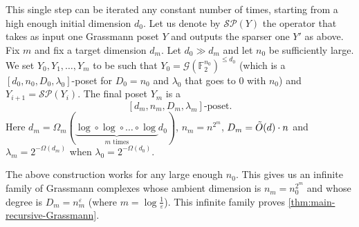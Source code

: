 \documentclass[10pt,a4paper]{article}
\newcommand{\prettyref}[1]{\cref{#1}}
\theoremstyle{definition}
\theoremstyle{remark}
\newcommand{\Authornotecolored}[3]{{\sffamily\small\color{#1}{[#2: #3]}}}
\newcommand{\Authornotecolored}[3]{}
\newcommand{\Snote}{\Authornotecolored{Green}{S}}
\newcommand{\snote}{\Snote}
\newcommand{\set}[1]{\{#1\}}
\newcommand{\F}{\mathbb{F}}
\renewcommand{\leq}{\leqslant}
\numberwithin{equation}{section}
\let\pref=\prettyref
\def\Gr{\mathcal{G}}
\def\Y{Y}
\def\diml{d}
\def\dimlin{{\diml}}
\def\dimlout{\diml'}
\def\lambdai{\lambda}
\def\lambdao{\lambda'}
\def\degree{D}
\def\M{\mathcal{SP}}
\begin{document}
\medskip
%


This single step can be iterated any constant number of times, starting from a high enough initial dimension \(\dimlin_0\). Let us denote by \(\M(\Y)\) the operator that takes as input one Grassmann poset \(\Y\) and outputs the sparser one \(\Y'\) as above. Fix \(m\) and fix a target dimension \(\dimlin_m\). Let \(\dimlin_0 \gg \dimlin_m\) and let \(n_0\) be sufficiently large. We set \(\Y_0,\Y_1,\dots,\Y_m\) to be such that \(\Y_0 = \Gr(\mathbb{F}_2^{n_0})^{\leq \dimlin_0}\) (which is a $[\dimlin_0,n_0,\degree_0,\lambda_0]$-poset for \(\degree_0=n_0\) and \(\lambda_0\) that goes to \(0\) with \(n_0\)) and \(\Y_{i+1} = \M(\Y_i)\). The final poset \(\Y_m\) is a 
\[ [\diml_m ,n_m,\degree_m,\lambda_m]\text{-poset.}\]
Here \(\diml_m = \Omega_m(\underbrace{\log \circ \log \circ \dots \circ \log }_{m \text{ times}} \dimlin_0)\), \(n_m=n^{2^m}\), \(\degree_m = \Tilde{O}(\dimlin) \cdot n\) and \(\lambda_m = 2^{-\Omega(\diml_m)}\) when \(\lambda_0 = 2^{-\Omega(d_0)}\).


The above construction works for any large enough \(n_0\). This gives us an infinite family of Grassmann complexes whose ambient dimension is \(n_m=n_0^{2^m}\) and whose degree is \(D_m = n_m^{\varepsilon}\) (where \(m=\log \frac{1}{\varepsilon}\)).  This infinite family proves \pref{thm:main-recursive-Grassmann}.
\end{document}
